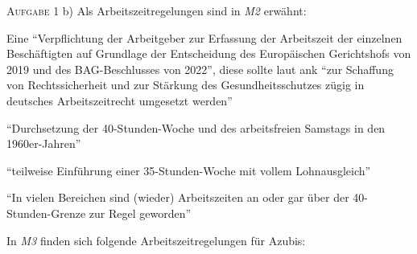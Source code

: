 \textsc{Aufgabe 1} b) \quad Als Arbeitszeitregelungen sind in \emph{M2} erwähnt:
\begin{myitemize}
    \item Eine \enquote{Verpflichtung der Arbeitgeber zur Erfassung der Arbeitszeit der einzelnen Beschäftigten auf Grundlage der Entscheidung des Europäischen Gerichtshofs von 2019 und des BAG-Beschlusses von 2022}, diese sollte laut \gls{ank} \enquote{zur Schaffung von Rechtssicherheit und zur Stärkung des Gesundheitsschutzes zügig in deutsches Arbeitszeitrecht umgesetzt werden}
    \item \enquote{Durchsetzung der 40-Stunden-Woche und des arbeitsfreien Samstags in den 1960er-Jahren}
    \item \enquote{teilweise Einführung einer 35-Stunden-Woche mit vollem Lohnausgleich}
    \item \enquote{In vielen Bereichen sind (wieder) Arbeitszeiten an oder gar über der 40-Stunden-Grenze zur Regel geworden}
\end{myitemize}
In \emph{M3} finden sich folgende Arbeitszeitregelungen für Azubis: 
